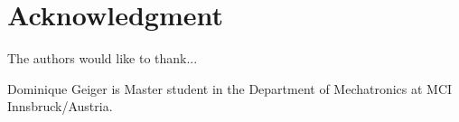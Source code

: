 \documentclass[journal,9pt]{IEEEtran}
\begin{document}








\section*{Acknowledgment}


The authors would like to thank...




%


%

\begin{IEEEbiography}{Dominique Geiger}
is Master student in the Department of Mechatronics at MCI Innsbruck/Austria.
\end{IEEEbiography}

\end{document}
